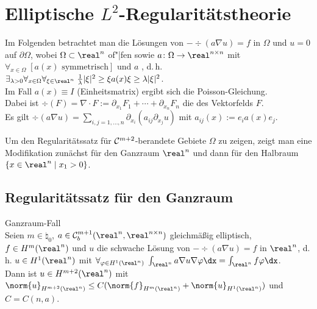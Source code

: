 \section{%
    Elliptische \texorpdfstring{$L^2$}{L²}-Regularitätstheorie%
}

\begin{Bem}
    Im Folgenden betrachtet man die Lösungen von
    $-\div(a \nabla u) = f$ in $\Omega$ und $u = 0$ auf $\partial\Omega$, wobei
    $\Omega \subset \real^n$ of"|fen sowie $a\colon \Omega \rightarrow \real^{n \times n}$ mit
    $\forall_{x \in \Omega}\; [\text{$a(x)$ symmetrisch}]$ und
    $a$ , d.\,h.
    $\exists_{\lambda > 0} \forall_{x \in \Omega} \forall_{\xi \in \real^n}\;
    \frac{1}{\lambda} |\xi|^2 \ge \xi a(x) \xi \ge \lambda |\xi|^2$.\\
    Im Fall $a(x) \equiv I$ (Einheitsmatrix) ergibt sich die Poisson-Gleichung.\\
    Dabei ist $\div(F) = \nabla \cdot F := \partial_{x_1} F_1 + \dotsb + \partial_{x_n} F_n$
    die  des Vektorfelds $F$.\\
    Es gilt $\div(a \nabla u) = \sum_{i,j=1,\dotsc,n} \partial_{x_i} (a_{ij} \partial_{x_j} u)$ mit
    $a_{ij}(x) := e_i a(x) e_j$.
\end{Bem}

\begin{Bem}
    Um den Regularitätssatz für $\mathcal{C}^{m+2}$-berandete Gebiete $\Omega$ zu zeigen, zeigt man
    eine Modifikation zunächst für den Ganzraum
    $\real^n$ und dann für den Halbraum $\{x \in \real^n \;|\; x_1 > 0\}$.
\end{Bem}

\subsection{%
    Regularitätssatz für den Ganzraum%
}

\begin{Satz}{Ganzraum-Fall}\\
    Seien $m \in \natural_0$,
    $a \in \C^{m+1}_b(\real^n, \real^{n \times n})$ gleichmäßig elliptisch,
    $f \in H^m(\real^n)$ und $u$ die schwache Lösung von
    $-\div(a \nabla u) = f$ in $\real^n$, d.\,h.
    $u \in H^1(\real^n)$ mit $\forall_{\varphi \in H^1(\real^n)}\;
    \int_{\real^n} a \nabla u \nabla\varphi \dx = \int_{\real^n} f\varphi \dx$.\\
    Dann ist $u \in H^{m+2}(\real^n)$ mit
    $\norm{u}_{H^{m+2}(\real^n)} \le
    C (\norm{f}_{H^m(\real^n)} + \norm{u}_{H^1(\real^n)})$ und $C = C(n, a)$.
\end{Satz}

